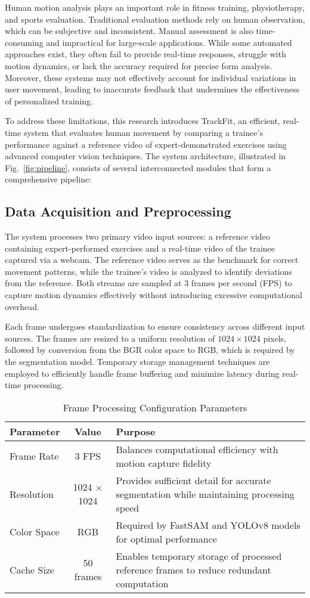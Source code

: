 \documentclass[conference]{IEEEtran}
\begin{document}
Human motion analysis plays an important role in fitness training, physiotherapy, and sports evaluation. Traditional evaluation methods rely on human observation, which can be subjective and inconsistent. Manual assessment is also time-consuming and impractical for large-scale applications. While some automated approaches exist, they often fail to provide real-time responses, struggle with motion dynamics, or lack the accuracy required for precise form analysis. Moreover, these systems may not effectively account for individual variations in user movement, leading to inaccurate feedback that undermines the effectiveness of personalized training.

To address these limitations, this research introduces TrackFit, an efficient, real-time system that evaluates human movement by comparing a trainee's performance against a reference video of expert-demonstrated exercises using advanced computer vision techniques. The system architecture, illustrated in Fig.~\ref{fig:pipeline}, consists of several interconnected modules that form a comprehensive pipeline:

\subsection{Data Acquisition and Preprocessing} 
The system processes two primary video input sources: a reference video containing expert-performed exercises and a real-time video of the trainee captured via a webcam. The reference video serves as the benchmark for correct movement patterns, while the trainee's video is analyzed to identify deviations from the reference. Both streams are sampled at 3 frames per second (FPS) to capture motion dynamics effectively without introducing excessive computational overhead.

Each frame undergoes standardization to ensure consistency across different input sources. The frames are resized to a uniform resolution of $1024 \times 1024$ pixels, followed by conversion from the BGR color space to RGB, which is required by the segmentation model. Temporary storage management techniques are employed to efficiently handle frame buffering and minimize latency during real-time processing.

\begin{table}[h]
\caption{Frame Processing Configuration Parameters}
\centering
\begin{tabular}{|l|c|p{4.5cm}|}
\hline
\textbf{Parameter} & \textbf{Value} & \textbf{Purpose} \\
\hline
Frame Rate & 3 FPS & Balances computational efficiency with motion capture fidelity \\
\hline
Resolution & 1024 × 1024 & Provides sufficient detail for accurate segmentation while maintaining processing speed \\
\hline
Color Space & RGB & Required by FastSAM and YOLOv8 models for optimal performance \\
\hline
Cache Size & 50 frames & Enables temporary storage of processed reference frames to reduce redundant computation \\
\hline
\end{tabular}
\end{table}
\end{document}
